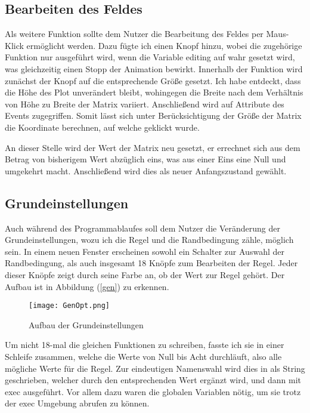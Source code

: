 \documentclass{scrartcl}
\begin{document}
\subsection{Bearbeiten des Feldes}
Als weitere Funktion sollte dem Nutzer die Bearbeitung des Feldes per Maus-Klick ermöglicht werden. Dazu fügte ich einen Knopf hinzu, wobei die zugehörige Funktion nur ausgeführt wird, wenn die Variable editing auf wahr gesetzt wird, was gleichzeitig einen Stopp der Animation bewirkt.
Innerhalb der Funktion wird zunächst der Knopf auf die entsprechende Größe gesetzt. Ich habe entdeckt, dass die Höhe des Plot unverändert bleibt, wohingegen die Breite nach dem Verhältnis von Höhe zu Breite der Matrix variiert. Anschließend wird auf Attribute des Events zugegriffen. Somit lässt sich unter Berücksichtigung der Größe der Matrix die Koordinate berechnen, auf welche geklickt wurde.

An dieser Stelle wird der Wert der Matrix neu gesetzt, er errechnet sich aus dem Betrag von bisherigem Wert abzüglich eins, was aus einer Eins eine Null und umgekehrt macht.
Anschließend wird dies als neuer Anfangszustand gewählt.

\subsection{Grundeinstellungen}
Auch während des Programmablaufes soll dem Nutzer die Veränderung der Grundeinstellungen, wozu ich die Regel und die Randbedingung zähle, möglich sein. In einem neuen Fenster erscheinen sowohl ein Schalter zur Auswahl der Randbedingung, als auch insgesamt 18 Knöpfe zum Bearbeiten der Regel. Jeder dieser Knöpfe zeigt durch seine Farbe an, ob der Wert zur Regel gehört. Der Aufbau ist in Abbildung (\ref{gen}) zu erkennen.

\begin{figure}[!h]
	\begin{center}
		\texttt{[image: GenOpt.png]}
		\caption{Aufbau der Grundeinstellungen}
		\label{blink1}
	\end{center}
\end{figure}

Um nicht 18-mal die gleichen Funktionen zu schreiben, fasste ich sie in einer Schleife zusammen, welche die Werte von Null bis Acht durchläuft, also alle mögliche Werte für die Regel. Zur eindeutigen Namenswahl wird dies in als String geschrieben, welcher durch den entsprechenden Wert ergänzt wird, und dann mit exec ausgeführt. Vor allem dazu waren die globalen Variablen nötig, um sie trotz der exec Umgebung abrufen zu können.
\end{document}
